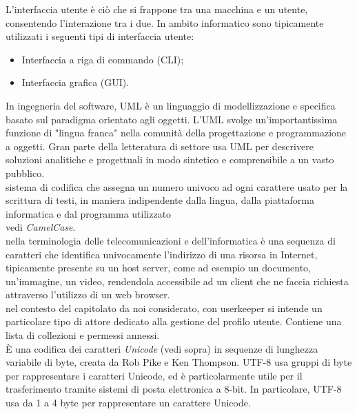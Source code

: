\documentclass{scalatekids-article}
\begin{document}
   L'interfaccia utente è ciò che si frappone tra una macchina e un utente, consentendo l'interazione tra i due. In ambito informatico sono tipicamente utilizzati i seguenti tipi di interfaccia utente:

  \begin{itemize}
  \item Interfaccia a riga di commando (CLI);
  \item Interfaccia grafica (GUI).
  \end{itemize}

   In ingegneria del software, UML è un linguaggio di modellizzazione e specifica basato sul paradigma orientato agli oggetti.
  L'UML svolge un'importantissima funzione di "lingua franca" nella comunità della progettazione e programmazione a oggetti. Gran parte della letteratura di settore usa UML per descrivere soluzioni analitiche e progettuali in modo sintetico e comprensibile a un vasto pubblico.
  \\

    sistema di codifica che assegna un numero univoco ad ogni carattere usato per la scrittura di testi, in maniera indipendente dalla lingua, dalla piattaforma informatica e dal programma utilizzato
   \\

   vedi \textit{CamelCase}.
  \\

   nella terminologia delle telecomunicazioni e dell'informatica è una sequenza di caratteri che identifica univocamente l'indirizzo di una risorsa in Internet, tipicamente presente su un host server, come ad esempio un documento, un'immagine, un video, rendendola accessibile ad un client che ne faccia richiesta attraverso l'utilizzo di un web browser.
  \\

   nel contesto del capitolato da noi considerato, con userkeeper si intende un particolare tipo di attore dedicato alla gestione del profilo utente. Contiene una lista di collezioni e permessi annessi.
  \\

   È una codifica dei caratteri \textit{Unicode} (vedi sopra) in sequenze di lunghezza variabile di byte, creata da Rob Pike e Ken Thompson. UTF-8 usa gruppi di byte per rappresentare i caratteri Unicode, ed è particolarmente utile per il trasferimento tramite sistemi di posta elettronica a 8-bit.
  In particolare, UTF-8 usa da 1 a 4 byte per rappresentare un carattere Unicode.
  \\
\end{document}
